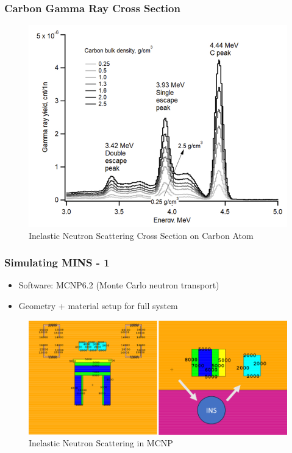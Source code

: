 \documentclass[xcolor=dvipsnames,envcountsect]{beamer}
\begin{document}
\begin{frame}
  \frametitle{Carbon Gamma Ray Cross Section}
  \begin{figure}
      \centering
      \includegraphics[width=.5\linewidth]{Figures/inscrosssection.png}
      \caption{Inelastic Neutron Scattering Cross Section on Carbon Atom}
      \label{fig:InelasticNeutronScatteringCS}
  \end{figure}
\end{frame}

\begin{frame}
  \frametitle{Simulating MINS - 1}
  \begin{itemize}
    \item Software: MCNP6.2 (Monte Carlo neutron transport)
    \item Geometry + material setup for full system
  \end{itemize}
  \begin{figure}
      \centering
      \includegraphics[width=\linewidth]{Figures/INSinMINS.png}
      \caption{Inelastic Neutron Scattering in MCNP}
      \label{fig:InelasticNeutronScatteringinMCNP}
  \end{figure}
\end{frame}
\end{document}
